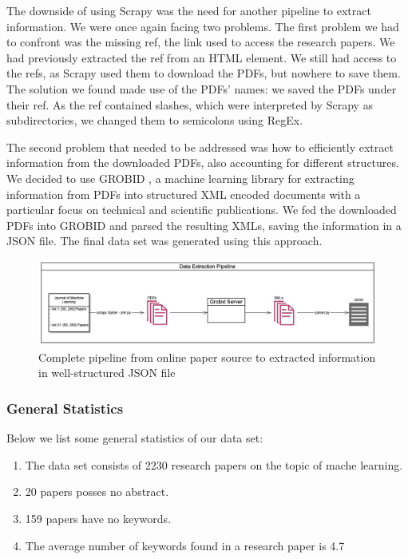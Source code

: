 The downside of using Scrapy \cite{kouzis2016learning} was the need for another pipeline to extract information. We were once again facing two problems. The first problem we had to confront was the missing ref, the link used to access the research papers. We had previously extracted the ref from an HTML element. We still had access to the refs, as Scrapy  \cite{kouzis2016learning}used them to download the PDFs, but nowhere to save them. The solution we found made use of the PDFs' names: we saved the PDFs under their ref. As the ref contained slashes, which were interpreted by Scrapy \cite{kouzis2016learning} as subdirectories, we changed them to semicolons using RegEx.


The second problem that needed to be addressed was how to efficiently extract information from the downloaded PDFs, also accounting for different structures. We decided to use GROBID \cite{GROBID}, a machine learning library for extracting information from PDFs into structured XML encoded documents with a particular focus on technical and scientific publications. We fed the downloaded PDFs into GROBID  \cite{GROBID} and parsed the resulting XMLs, saving the information in a JSON file. The final data set was generated using this approach.


\begin{figure}[h]
    \centering
    \includegraphics[width=1.0\linewidth]{imgs/data_pipeline.png}
    \caption{Complete pipeline from online paper source to extracted information in well-structured JSON file}
    \label{fig:data pipeline}
\end{figure}

\subsubsection{General Statistics}
\subsubcomment{}
Below we list some general statistics of our data set:
\begin{enumerate}
	\item The data set consists of 2230 research papers on the topic of mache learning.
	\item 20 papers posses no abstract.
	\item 159 papers have no keywords.
	\item The average number of keywords found in a research paper is 4.7
\end{enumerate}
